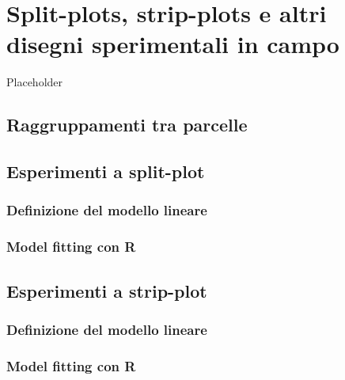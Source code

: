 \documentclass[a4paper,12pt,oneside]{book}
\begin{document}
\hypertarget{split-plots-strip-plots-e-altri-disegni-sperimentali-in-campo}{%
\chapter{Split-plots, strip-plots e altri disegni sperimentali in campo}\label{split-plots-strip-plots-e-altri-disegni-sperimentali-in-campo}}

Placeholder

\hypertarget{raggruppamenti-tra-parcelle}{%
\section{Raggruppamenti tra parcelle}\label{raggruppamenti-tra-parcelle}}

\hypertarget{esperimenti-a-split-plot}{%
\section{Esperimenti a split-plot}\label{esperimenti-a-split-plot}}

\hypertarget{definizione-del-modello-lineare-3}{%
\subsection{Definizione del modello lineare}\label{definizione-del-modello-lineare-3}}

\hypertarget{model-fitting-con-r}{%
\subsection{Model fitting con R}\label{model-fitting-con-r}}

\hypertarget{esperimenti-a-strip-plot}{%
\section{Esperimenti a strip-plot}\label{esperimenti-a-strip-plot}}

\hypertarget{definizione-del-modello-lineare-4}{%
\subsection{Definizione del modello lineare}\label{definizione-del-modello-lineare-4}}

\hypertarget{model-fitting-con-r-1}{%
\subsection{Model fitting con R}\label{model-fitting-con-r-1}}
\end{document}
